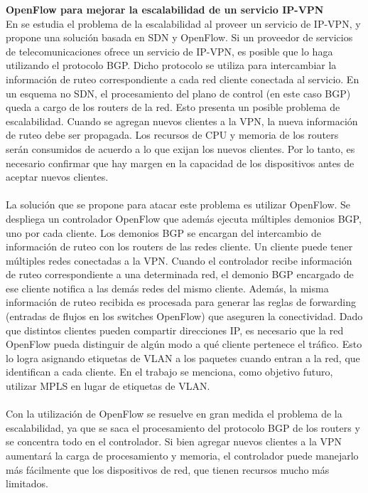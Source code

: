 \textbf{OpenFlow para mejorar la escalabilidad de un servicio IP-VPN} \\
En \cite{ip-vpn-bgp-sdn} se estudia el problema de la escalabilidad al proveer un servicio de IP-VPN, y propone una solución basada en SDN y OpenFlow. Si un proveedor de servicios de telecomunicaciones ofrece un servicio de IP-VPN, es posible que lo haga utilizando el protocolo BGP. Dicho protocolo se utiliza para intercambiar la información de ruteo correspondiente a cada red cliente conectada al servicio. En un esquema no SDN, el procesamiento del plano de control (en este caso BGP) queda a cargo de los routers de la red. Esto presenta un posible problema de escalabilidad. Cuando se agregan nuevos clientes a la VPN, la nueva información de ruteo debe ser propagada. Los recursos de CPU y memoria de los routers serán consumidos de acuerdo a lo que exijan los nuevos clientes. Por lo tanto, es necesario confirmar que hay margen en la capacidad de los dispositivos antes de aceptar nuevos clientes. \\ \\
La solución que se propone para atacar este problema es utilizar OpenFlow. Se despliega un controlador OpenFlow que además ejecuta múltiples demonios BGP, uno por cada cliente. Los demonios BGP se encargan del intercambio de información de ruteo con los routers de las redes cliente. Un cliente puede tener múltiples redes conectadas a la VPN. Cuando el controlador recibe información de ruteo correspondiente a una determinada red, el demonio BGP encargado de ese cliente notifica a las demás redes del mismo cliente. Además, la misma información de ruteo recibida es procesada para generar las reglas de forwarding (entradas de flujos en los switches OpenFlow) que aseguren la conectividad. Dado que distintos clientes pueden compartir direcciones IP, es necesario que la red OpenFlow pueda distinguir de algún modo a qué cliente pertenece el tráfico. Esto lo logra asignando etiquetas de VLAN a los paquetes cuando entran a la red, que identifican a cada cliente. En el trabajo se menciona, como objetivo futuro, utilizar MPLS en lugar de etiquetas de VLAN. \\ \\
Con la utilización de OpenFlow se resuelve en gran medida el problema de la escalabilidad, ya que se saca el procesamiento del protocolo BGP de los routers y se concentra todo en el controlador. Si bien agregar nuevos clientes a la VPN aumentará la carga de procesamiento y memoria, el controlador puede manejarlo más fácilmente que los dispositivos de red, que tienen recursos mucho más limitados. \\ \\
